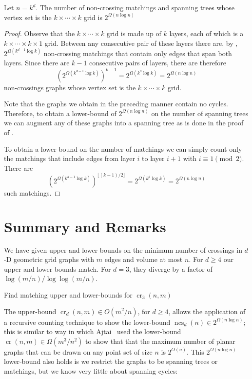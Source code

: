 \documentclass{patmorin}
\DeclareMathOperator{\crs}{cr}
\DeclareMathOperator{\ncs}{ncs}
\begin{document}
\begin{cor}
  Let $n=k^d$.  The number of non-crossing matchings and spanning trees
  whose vertex set is the $k\times\cdots\times k$ grid is $2^{\Omega(n\log
  n)}$
\end{cor}

\begin{proof}
  Observe that the $k\times\cdots\times k$ grid is made up of $k$ layers,
  each of which is a $k\times\cdots\times k\times1$ grid. Between any
  consecutive pair of these layers there are, by ,
  $2^{\Omega(k^{d-1}\log k)}$ non-crossing matchings that contain only
  edges that span both layers.  Since there are $k-1$ consecutive pairs
  of layers, there are therefore
  \[
     \left(2^{\Omega(k^{d-1}\log k)}\right)^{k-1} = 2^{\Omega(k^d\log k)} 
        = 2^{\Omega(n\log n)}
  \]
  non-crossings graphs whose vertex set is the $k\times\cdots\times k$ grid.

  Note that the graphs we obtain in the preceding manner contain no
  cycles.  Therefore, to obtain a lower-bound of $2^{\Omega(n\log n)}$
  on the number of spanning trees we can augment any of these graphs
  into a spanning tree as is done in the proof of .

  To obtain a lower-bound on the number of matchings we can simply count
  only the matchings that include edges from layer $i$ to layer $i+1$
  with $i\equiv 1\pmod 2$.  There are
  \[
     \left(2^{\Omega(k^{d-1}\log k)}\right)^{\lfloor (k-1)/2\rfloor} 
       = 2^{\Omega(k^d\log k)}
       = 2^{\Omega(n\log n)}
  \]
  such matchings.
\end{proof}


\section{Summary and Remarks}

We have given upper and lower bounds on the minimum number of crossings
in $d$-D geometric grid graphs with $m$ edges and volume at most $n$.
For $d\ge 4$ our upper and lower bounds match.  For $d=3$, they diverge
by a factor of $\log(m/n)/\log\log(m/n)$.

\begin{op}
  Find matching upper and lower-bounds for $\crs_3(n,m)$
\end{op}

The upper-bound $\crs_d(n,m)\in O(m^2/n)$, for $d\ge 4$, allows the
application of a recursive counting technique to show the lower-bound
$\ncs_d(n)\in 2^{\Omega(n\log n)}$; this is similar to way in which Ajtai
\etal\ used the lower-bound $\crs(n,m)\in\Omega(m^3/n^2)$ to show that
that the maximum number of planar graphs that can be drawn on any point
set of size $n$ is $2^{O(n)}$.  This $2^{\Omega(n\log n)}$ lower-bound
also holds is we restrict the graphs to be spanning trees or matchings, but we know very little about spanning cycles:
\end{document}
